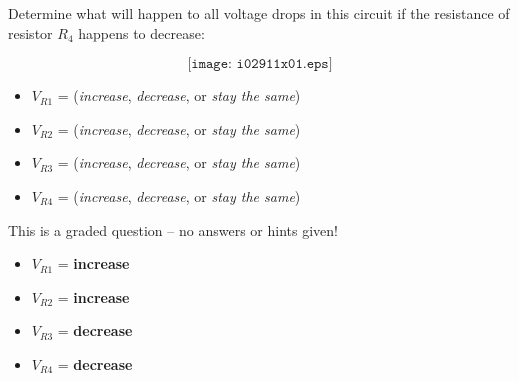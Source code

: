 

Determine what will happen to all voltage drops in this circuit if the resistance of resistor $R_4$ happens to decrease:

$$\texttt{[image: i02911x01.eps]}$$

\begin{itemize}
\item{} $V_{R1}$ = ({\it increase}, {\it decrease}, or {\it stay the same})
\vskip 10pt
\item{} $V_{R2}$ = ({\it increase}, {\it decrease}, or {\it stay the same})
\vskip 10pt
\item{} $V_{R3}$ = ({\it increase}, {\it decrease}, or {\it stay the same})
\vskip 10pt
\item{} $V_{R4}$ = ({\it increase}, {\it decrease}, or {\it stay the same})
\end{itemize}

\vfil 

\eject






This is a graded question -- no answers or hints given!







\begin{itemize}
\item{} $V_{R1}$ = {\bf increase}
\vskip 10pt
\item{} $V_{R2}$ = {\bf increase}
\vskip 10pt
\item{} $V_{R3}$ = {\bf decrease}
\vskip 10pt
\item{} $V_{R4}$ = {\bf decrease}
\end{itemize}




